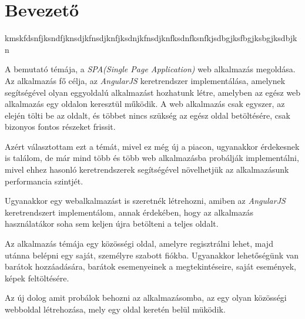 \chapter{Bevezető}\label{ch:BEVEZET}


\setlength{\parindent}{4em}
\setlength{\parskip}{1em}
kmskfdsnfjksndfjknsdjkfnsdjknfjksdnjkfnsdjknfksdnfksnfkjsdbgjksfbgjksbgjksdbjkn
\par A bemutató témája, a \textit{SPA(Single Page Application)} web alkalmazás megoldása. Az alkalmazás fő célja, az \textit{AngularJS} keretrendszer implementálása, amelynek segítségével olyan eggyoldalú alkalmazást hozhatunk létre, amelyben az egész web alkalmazás egy oldalon keresztül működik. A web alkalmazás csak egyszer, az elején tölti be az oldalt, és többet nincs szükség az egész oldal betöltésére, csak bizonyos fontos részeket frissit.

\par Azért választottam ezt a témát, mivel ez még új a piacon, ugyanakkor érdekesnek is találom, de már mind több és több web alkalmazásba probálják implementálni, mivel ehhez hasonló keretrendszerek segítségével növelhetjük az alkalmazásunk performancia szintjét.

\par Ugyanakkor egy webalkalmazást is szeretnék létrehozni, amiben az \textit{AngularJS} keretrendszert implementálom, annak érdekében, hogy az alkalmazás használatákor soha sem keljen újra betölteni a teljes oldalt.

\par Az alkalmazás témája egy közösségi oldal, amelyre regisztrálni lehet, majd utánna belépni egy saját, személyre szabott fiókba. Ugyanakkor lehetőségünk van barátok hozzáadására, barátok esemenyeinek a megtekintéseire, saját események, képek feltöltésére. 

\par Az új dolog amit probálok behozni az alkalmazásomba, az egy olyan közösségi webboldal létrehozása, mely egy oldal keretén belül müködik. 

 

